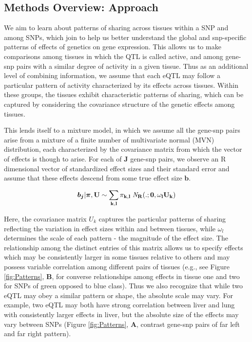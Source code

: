 \subsection{Methods Overview: Approach} 

We aim to learn about patterns of sharing across tissues within a SNP and among SNPs, which join to help us better understand the global and snp-specific patterns of effects of genetics on gene expression. 
This allows us to make comparisons among tissues in which the QTL is called active, and among gene-snp pairs with a similar degree of activity in a given tissue. 
Thus as an additional level of combining information, we assume that each eQTL may follow a particular pattern of activity characterized by its effects across tissues. Within these groups, the tissues exhibit characteristic patterns of sharing, which can be captured by considering the covariance structure of the genetic effects among tissues. 

This lends itself to a mixture model, in which  we assume all the gene-snp pairs arise from a mixture of a finite number of multivariate normal (MVN) distribution, each characterized by the covariance matrix from which the vector of effects is though to arise. For each of $\textbf{J}$ gene-snp pairs, we observe an R dimensional vector of standardized effect sizes %
and their standard error and assume that these effects descend from some true effect size $\bm{b}$. 



 \begin{equation}
  \bm{b_{j}} | \bm{\pi},\bf{U} \sim \sum_{k,l} \pi_{k,l} \;{\it N}_R(.;\bm{0}, \omega_l U_{k})
  \label{eqn:mixprior}
\end{equation}

Here, the covariance matrix $U_{k}$ captures the particular patterns of sharing reflecting the variation in effect sizes within and between tissues, while $\omega_{l}$ determines the scale of each pattern - the magnitude of the effect size. The relationship among the distinct entries of this matrix allows us to specify effects which may be consistently larger in some tissues relative to others and may possess variable correlation among different pairs of tissues (e.g., see Figure \ref{fig:Patterns}, \textbf{B}, for converse relationships among effects in tissue one and two for SNPs of green opposed to blue class). Thus we also recognize that while two eQTL may obey a similar pattern or shape, the absolute scale may vary. For example, two eQTL may both have strong correlation between liver and lung with consistently larger effects in liver, but the absolute size of the effects may vary between SNPs (Figure \ref{fig:Patterns}, \textbf{A}, contrast gene-snp pairs of far left and far right pattern).\newline

